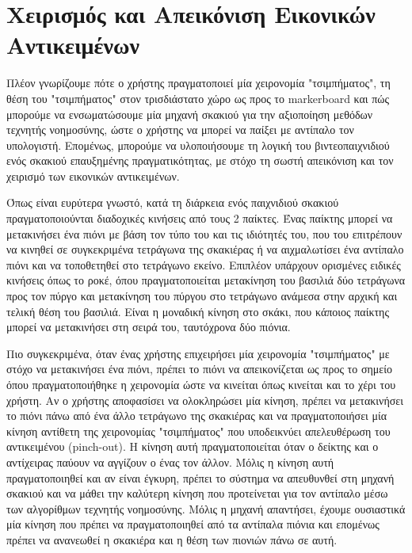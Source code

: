 \section{Χειρισμός και Απεικόνιση Εικονικών Αντικειμένων} \label{s:rendering}



Πλέον γνωρίζουμε πότε ο χρήστης πραγματοποιεί μία χειρονομία "τσιμπήματος", τη θέση του "τσιμπήματος" στον τρισδιάστατο χώρο ως προς το markerboard και πώς μπορούμε να ενσωματώσουμε μία μηχανή σκακιού για την αξιοποίηση μεθόδων τεχνητής νοημοσύνης, ώστε ο χρήστης να μπορεί να παίξει με αντίπαλο τον υπολογιστή.
Επομένως, μπορούμε να υλοποιήσουμε τη λογική του βιντεοπαιχνιδιού ενός σκακιού επαυξημένης πραγματικότητας, με στόχο τη σωστή απεικόνιση και τον χειρισμό των εικονικών αντικειμένων.


Όπως είναι ευρύτερα γνωστό, κατά τη διάρκεια ενός παιχνιδιού σκακιού πραγματοποιούνται διαδοχικές κινήσεις από τους 2 παίκτες. Ένας παίκτης μπορεί να μετακινήσει ένα πιόνι με βάση τον τύπο του και τις ιδιότητές του, που του επιτρέπουν να κινηθεί σε συγκεκριμένα τετράγωνα της σκακιέρας ή να αιχμαλωτίσει ένα αντίπαλο πιόνι και να τοποθετηθεί στο τετράγωνο εκείνο. Επιπλέον υπάρχουν ορισμένες ειδικές κινήσεις όπως το ροκέ, όπου πραγματοποιείται μετακίνηση του βασιλιά δύο τετράγωνα προς τον πύργο και μετακίνηση του πύργου στο τετράγωνο ανάμεσα στην αρχική και τελική θέση του βασιλιά. Είναι η μοναδική κίνηση στο σκάκι, που κάποιος παίκτης μπορεί να μετακινήσει στη σειρά του, ταυτόχρονα δύο πιόνια.

Πιο συγκεκριμένα, όταν ένας χρήστης επιχειρήσει μία χειρονομία "τσιμπήματος" με στόχο να μετακινήσει ένα πιόνι, πρέπει το πιόνι να απεικονίζεται ως προς το σημείο όπου πραγματοποιήθηκε η χειρονομία ώστε να κινείται όπως κινείται και το χέρι του χρήστη.
Αν ο χρήστης αποφασίσει να ολοκληρώσει μία κίνηση, πρέπει να μετακινήσει το πιόνι πάνω από ένα άλλο τετράγωνο της σκακιέρας και να πραγματοποιήσει μία κίνηση αντίθετη της χειρονομίας "τσιμπήματος" που υποδεικνύει απελευθέρωση του αντικειμένου (pinch-out). Η κίνηση αυτή πραγματοποιείται όταν ο δείκτης και ο αντίχειρας παύουν να αγγίζουν ο ένας τον άλλον.  
Μόλις η κίνηση αυτή πραγματοποιηθεί και αν είναι έγκυρη, πρέπει το σύστημα να απευθυνθεί στη μηχανή σκακιού και να μάθει την καλύτερη κίνηση που προτείνεται για τον αντίπαλο μέσω των αλγορίθμων τεχνητής νοημοσύνης. 
Μόλις η μηχανή απαντήσει, έχουμε ουσιαστικά μία κίνηση που πρέπει να πραγματοποιηθεί από τα αντίπαλα πιόνια και επομένως πρέπει να ανανεωθεί η σκακιέρα και η θέση των πιονιών πάνω σε αυτή. 

